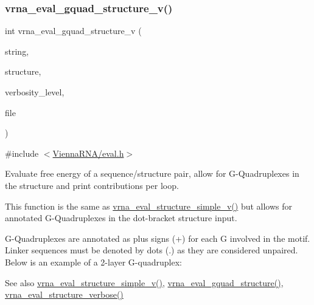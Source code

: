 \subsubsection{\texorpdfstring{vrna\_eval\_gquad\_structure\_v()}{vrna\_eval\_gquad\_structure\_v()}}
{\footnotesize\ttfamily int vrna\+\_\+eval\+\_\+gquad\+\_\+structure\+\_\+v (\begin{DoxyParamCaption}\item[{const char $\ast$}]{string,  }\item[{const char $\ast$}]{structure,  }\item[{int}]{verbosity\+\_\+level,  }\item[{F\+I\+LE $\ast$}]{file }\end{DoxyParamCaption})}



{\ttfamily \#include $<$\mbox{\hyperlink{eval_8h}{Vienna\+R\+N\+A/eval.\+h}}$>$}



Evaluate free energy of a sequence/structure pair, allow for G-\/\+Quadruplexes in the structure and print contributions per loop. 

This function is the same as \mbox{\hyperlink{group__eval_gacd6278343e77d13f1d53588e50d303bc}{vrna\+\_\+eval\+\_\+structure\+\_\+simple\+\_\+v()}} but allows for annotated G-\/\+Quadruplexes in the dot-\/bracket structure input.

G-\/\+Quadruplexes are annotated as plus signs (\textquotesingle{}+\textquotesingle{}) for each G involved in the motif. Linker sequences must be denoted by dots (\textquotesingle{}.\textquotesingle{}) as they are considered unpaired. Below is an example of a 2-\/layer G-\/quadruplex\+: 
\begin{DoxyCode}{0}
\end{DoxyCode}


\begin{DoxySeeAlso}{See also}
\mbox{\hyperlink{group__eval_gacd6278343e77d13f1d53588e50d303bc}{vrna\+\_\+eval\+\_\+structure\+\_\+simple\+\_\+v()}}, \mbox{\hyperlink{group__eval_ga3263504825ef4b523eba797c99921df4}{vrna\+\_\+eval\+\_\+gquad\+\_\+structure()}}, \mbox{\hyperlink{group__eval_ga0928d699d310178f84ee2351034e5cb5}{vrna\+\_\+eval\+\_\+structure\+\_\+verbose()}}
\end{DoxySeeAlso}

